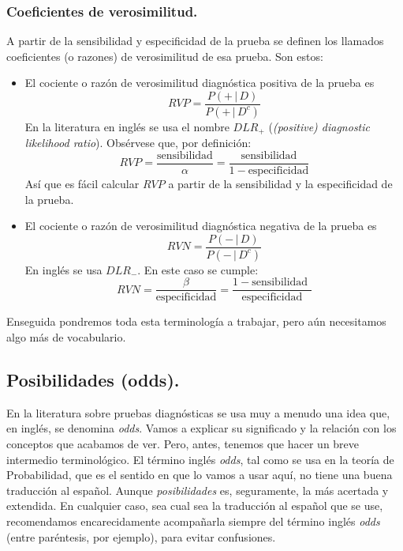 \subsubsection*{Coeficientes de verosimilitud.}

A partir de la sensibilidad y especificidad de la prueba se definen los llamados coeficientes (o razones) de verosimilitud de esa prueba. Son estos:
     \begin{itemize}
        \item El {\sf cociente o razón de verosimilitud diagnóstica positiva} de la prueba es
        \begin{equation}\label{cap03:ecu:RazonVerosimilitudPositiva}
            RVP=\dfrac{P(+\,|\,D)}{P(+\,|\,D^c)}
        \end{equation}
        En la literatura en inglés se usa el nombre $DLR_+$ ({\em (positive) diagnostic likelihood ratio}). Obsérvese que, por definición:
        \[
        RVP=\dfrac{\mbox{sensibilidad}}{\alpha}=\dfrac{\mbox{sensibilidad}}{1-\mbox{especificidad}}
        \]
        Así que es fácil calcular $RVP$ a partir de la sensibilidad y la especificidad de la prueba.

        \item El {\sf cociente o razón de verosimilitud diagnóstica negativa} de la prueba es
        \begin{equation}\label{cap03:ecu:RazonVerosimilitudNegativa}
        RVN=\dfrac{P(-\,|\,D)}{P(-\,|\,D^c)}
        \end{equation}
        En inglés se usa $DLR_-$. En este caso se cumple:
        \[
        RVN=\dfrac{\beta}{\mbox{especificidad}}=\dfrac{1-\mbox{sensibilidad }}{\mbox{especificidad}}
        \]
     \end{itemize}

Enseguida pondremos toda esta terminología a trabajar, pero aún necesitamos algo más de
vocabulario.

\subsection{Posibilidades (odds).}
\label{cap03:subsec:PosibilidadesOdds}

En la literatura sobre pruebas diagnósticas se usa muy a menudo una idea que, en inglés, se denomina {\em odds}. Vamos a explicar su significado y la relación con los conceptos que acabamos de ver. Pero, antes, tenemos que hacer un breve intermedio terminológico. El término inglés {\em odds}, tal como se usa en la teoría de Probabilidad, que es el sentido en que lo vamos a usar aquí, no tiene una buena traducción al español. Aunque {\em posibilidades} es, seguramente, la más acertada y extendida. En cualquier caso, sea cual sea la traducción al español que se use, recomendamos encarecidamente acompañarla siempre del término inglés {\em odds} (entre paréntesis, por ejemplo), para evitar confusiones.

